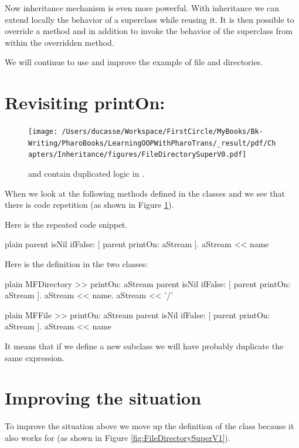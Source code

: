 \documentclass[10pt,twoside,english]{_support/latex/sbabook/sbabook}
\begin{document}
Now inheritance mechanism is even more powerful. With inheritance we can extend locally the behavior of a superclass while reusing it. It is then possible to override a method and in addition to invoke the behavior of the superclass from within the overridden method. 

We will continue to use and improve the example of file and directories.
\section{Revisiting printOn:}

\begin{figure}

\begin{center}
\texttt{[image: /Users/ducasse/Workspace/FirstCircle/MyBooks/Bk-Writing/PharoBooks/LearningOOPWithPharoTrans/\_result/pdf/Chapters/Inheritance/figures/FileDirectorySuperV0.pdf]}\caption{ and  contain duplicated logic in .\label{fig:FileDirectorySuperV0}}\end{center}
\end{figure}


When we look at the following  methods defined in the classes  and 
we see that there is code repetition (as shown in Figure \ref{fig:FileDirectorySuperV0}).

Here is the repeated code snippet.

\begin{displaycode}{plain}
parent isNil 
	ifFalse: [ parent printOn: aStream ].
aStream << name
\end{displaycode}

Here is the definition in the two classes: 

\begin{displaycode}{plain}
MFDirectory >> printOn: aStream
	parent isNil 
		ifFalse: [ parent printOn: aStream ].
	aStream << name.
	aStream << '/'
\end{displaycode}

\begin{displaycode}{plain}
MFFile >> printOn: aStream
	parent isNil 
		ifFalse: [ parent printOn: aStream ].
	aStream << name
\end{displaycode}

It means that if we define a new subclass we will have probably duplicate the same expression.
\section{Improving the situation}
To improve the situation above we move up the definition of the  class because it also works for  (as shown in Figure \ref{fig:FileDirectorySuperV1}).
\end{document}
